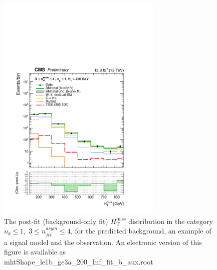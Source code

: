 \begin{figure}[tbhp]
    \caption{ 
    The post-fit (background-only fit) $H_{\mathrm{T}}^{\mathrm{miss}}$ distribution in the category $n_{b}\leq 1, \; 3 \leq n_{jet}^{asym} \leq 4$, 
    for the predicted background, an example of a signal model and the observation.
    An electronic version of this figure is available as mhtShape\_le1b\_ge3a\_200\_Inf\_fit\_b\_aux.root
    \label{fig:mhtShape_le1b_ge3a_fit_b} }
  \begin{center}
  \includegraphics[width=0.7\textwidth]{mhtShape_le1b_ge3a_200_Inf_fit_b_aux}
  \end{center}
\end{figure}



